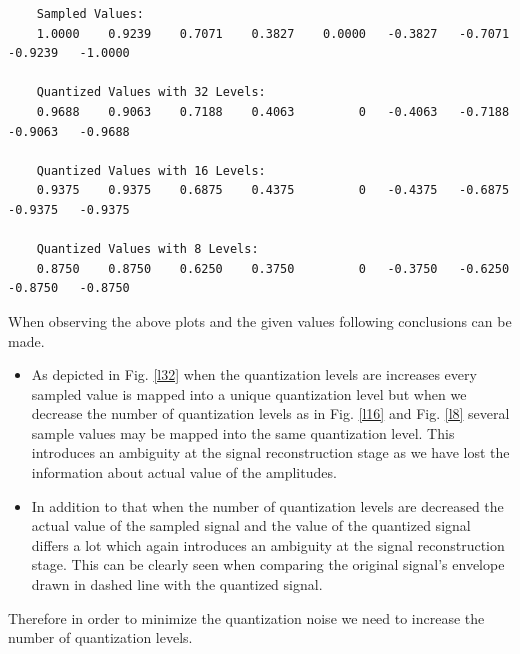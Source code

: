 \documentclass[a4paper,11pt]{article}%
\begin{document}
\pagebreak

\begin{verbatim}
	Sampled Values:		
	1.0000    0.9239    0.7071    0.3827    0.0000   -0.3827   -0.7071   -0.9239   -1.0000
	
	Quantized Values with 32 Levels:	
	0.9688    0.9063    0.7188    0.4063         0   -0.4063   -0.7188   -0.9063   -0.9688	
	
	Quantized Values with 16 Levels:
	0.9375    0.9375    0.6875    0.4375         0   -0.4375   -0.6875   -0.9375   -0.9375
	
	Quantized Values with 8 Levels:	
	0.8750    0.8750    0.6250    0.3750         0   -0.3750   -0.6250   -0.8750   -0.8750
\end{verbatim}
\vspace{1cm}
When observing the above plots and the given values  following conclusions can be made.\\ 

\begin{itemize}
	\item As depicted in Fig. \ref{l32} when the quantization levels are increases every sampled value is mapped into a unique quantization level but when we decrease the number of quantization levels as in Fig. \ref{l16} and Fig. \ref{l8} several sample values may be mapped into the same quantization level. This introduces an ambiguity at the signal reconstruction stage as we have lost the information about actual value of the amplitudes.
	
	\item In  addition to that when the number of quantization levels are decreased the actual value of the sampled signal and the value of the quantized signal differs a lot which again introduces an ambiguity at the signal reconstruction stage. This can be clearly seen when comparing the original signal's envelope drawn in dashed line with the quantized signal.
\end{itemize}

Therefore in order to minimize the quantization noise we need to increase the number of quantization levels.
 

  

  
\end{document}
